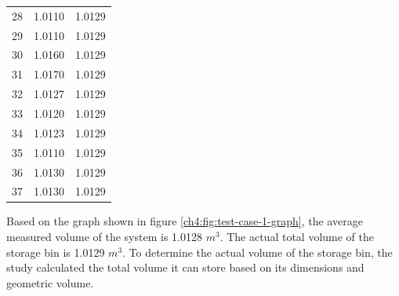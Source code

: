 \begin{table}[H]
\begin{threeparttable}
\begin{tabular}{l c r}
			28              & 1.0110                                                   & 1.0129                                                  \\
			29              & 1.0110                                                   & 1.0129                                                  \\
			30              & 1.0160                                                   & 1.0129                                                  \\
			31              & 1.0170                                                   & 1.0129                                                  \\
			32              & 1.0127                                                   & 1.0129                                                  \\
			33              & 1.0120                                                   & 1.0129                                                  \\
			34              & 1.0123                                                   & 1.0129                                                  \\
			35              & 1.0110                                                   & 1.0129                                                  \\
			36              & 1.0130                                                   & 1.0129                                                  \\
			37              & 1.0130                                                   & 1.0129                                                  \\ \bottomrule
		\end{tabular}
	\end{threeparttable}
\end{table}



Based on the graph shown in figure \ref{ch4:fig:test-case-1-graph}, the average measured volume of the system is 1.0128 $m^3$. The actual total volume of the storage bin is 1.0129 $m^3$. To determine the actual volume of the storage bin, the study calculated the total volume it can store based on its dimensions and geometric volume.

